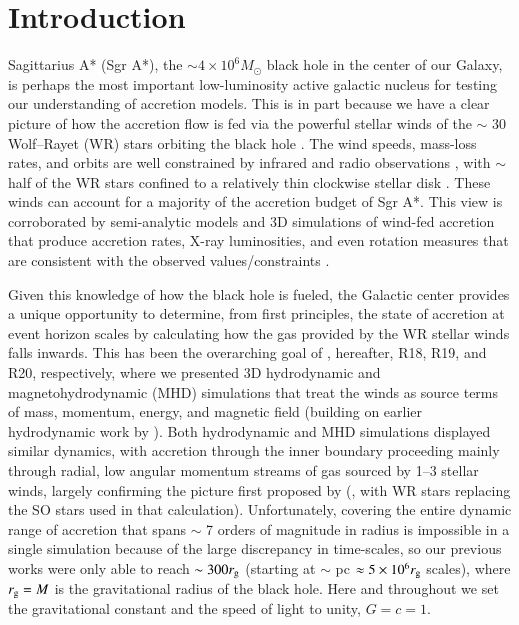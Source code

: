 \documentclass[twocolumn,twocolappendix,apjl,appendixfloats]{aastex63}
\begin{document}
\section{Introduction}
Sagittarius A* (Sgr A*), the $\sim 4 \times 10^6 M_\odot$  \citep{GravityS2,Do2019} black hole in the center of our Galaxy, is perhaps the most important low-luminosity active galactic nucleus for testing our understanding of accretion models.  This is in part because we have a clear picture of how the accretion flow is fed via the powerful stellar winds of the $\sim$ 30 Wolf--Rayet (WR) stars orbiting the black hole \citep{Paumard2006}.  The wind speeds, mass-loss rates, and orbits are well constrained by infrared \citep{Martins2007} and radio observations \citep{YZ2015}, with $\sim$ half of the WR stars confined to a relatively thin clockwise stellar disk \citep{Belo2006,Lu2009}.  These winds can account for a majority of the accretion budget of Sgr A*. This view is corroborated by semi-analytic models and 3D simulations of wind-fed accretion that produce accretion rates, X-ray luminosities, and even rotation measures that are consistent with the observed values/constraints \citep{Quataert2004,Cuadra2008,Shcherbakov2010,Russell2017,Ressler2018,Ressler2019,Ressler2020,Calderon2020}.  

Given this knowledge of how the black hole is fueled, the Galactic center provides a unique opportunity to determine, from first principles, the state of accretion at event horizon scales by calculating how the gas provided by the WR stellar winds falls inwards.  This has been the overarching goal of \citet{Ressler2018,Ressler2019,Ressler2020}, hereafter, R18, R19, and R20, respectively, where we presented 3D hydrodynamic and magnetohydrodynamic (MHD) simulations that treat the winds as source terms of mass, momentum, energy, and magnetic field (building on earlier hydrodynamic work by \citealt{Cuadra2005,Cuadra2006,Cuadra2008}).  Both hydrodynamic and MHD simulations displayed similar dynamics, with accretion through the inner boundary proceeding mainly through radial, low angular momentum streams of gas sourced by 1--3 stellar winds, largely confirming the picture first proposed by \citeauthor{Loeb2004} (\citeyear{Loeb2004}, with WR stars replacing the SO stars used in that calculation).  Unfortunately, covering the entire dynamic range of accretion that spans $\sim$ 7 orders of magnitude in radius is impossible in a single simulation because of the large discrepancy in time-scales, so our previous works were only able to reach $\sim 300 r_{\rm g}$ (starting at $\sim $ pc $\approx  5 \times 10^6 r_{\rm g}$ scales), where $r_{\rm g} = M$ is the gravitational radius of the black hole.  Here and throughout we set the gravitational constant and the speed of light to unity, $G=c=1$.   
\end{document}
